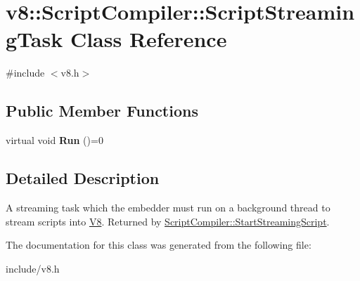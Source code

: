 \hypertarget{classv8_1_1_script_compiler_1_1_script_streaming_task}{}\section{v8\+:\+:Script\+Compiler\+:\+:Script\+Streaming\+Task Class Reference}
\label{classv8_1_1_script_compiler_1_1_script_streaming_task}


{\ttfamily \#include $<$v8.\+h$>$}

\subsection*{Public Member Functions}
\begin{DoxyCompactItemize}
\item 
virtual void {\bfseries Run} ()=0\hypertarget{classv8_1_1_script_compiler_1_1_script_streaming_task_a8eb7a750cbd26ee62c70067c0408c3e1}{}\label{classv8_1_1_script_compiler_1_1_script_streaming_task_a8eb7a750cbd26ee62c70067c0408c3e1}

\end{DoxyCompactItemize}


\subsection{Detailed Description}
A streaming task which the embedder must run on a background thread to stream scripts into \hyperlink{classv8_1_1_v8}{V8}. Returned by \hyperlink{classv8_1_1_script_compiler_a406bb44ef02d644d94bccd3f7b04f2d4}{Script\+Compiler\+::\+Start\+Streaming\+Script}. 

The documentation for this class was generated from the following file\+:\begin{DoxyCompactItemize}
\item 
include/v8.\+h\end{DoxyCompactItemize}
